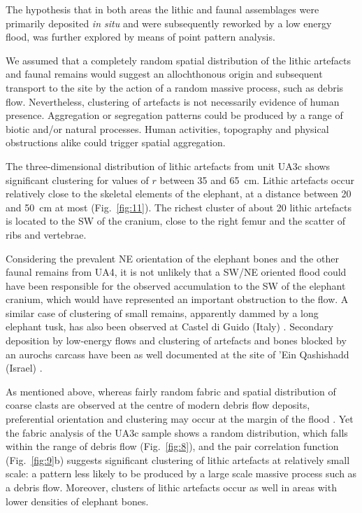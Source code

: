 \documentclass[preprint,authoryear,times]{elsarticle} %
\begin{document}
The hypothesis that in both areas the lithic and faunal assemblages were primarily deposited \emph{in situ} and were subsequently reworked by a low energy flood, was further explored by means of point pattern analysis.

We assumed that a completely random spatial distribution of the lithic artefacts and faunal remains would suggest an allochthonous origin and subsequent transport to the site by the action of a random massive process, such as debris flow. Nevertheless, clustering of artefacts is not necessarily evidence of human presence. Aggregation or segregation patterns could be produced by a range of biotic and/or natural processes. Human activities, topography and physical obstructions alike could trigger spatial aggregation.


The three-dimensional distribution of lithic artefacts from unit UA3c shows significant clustering for values of $r$ between 35 and 65~cm. Lithic artefacts occur relatively close to the skeletal elements of the elephant, at a distance between 20 and 50~cm at most (Fig.~\ref{fig:11}). The richest cluster of about 20 lithic artefacts is located to the SW of the cranium, close to the right femur and the scatter of ribs and vertebrae.

Considering the prevalent NE orientation of the elephant bones and the other faunal remains from UA4, it is not unlikely that a SW/NE oriented flood could have been responsible for the observed accumulation to the SW of the elephant cranium, which would have represented an important obstruction to the flow. A similar case of clustering of small remains, apparently dammed by a long elephant tusk, has also been observed at Castel di Guido (Italy) \citep{Boschian2010}. Secondary deposition by low-energy flows and clustering of artefacts and bones blocked by an aurochs carcass have been as well documented at the site of 'Ein Qashishadd (Israel) \citep{Hovers2014}.

As mentioned above, whereas fairly random fabric and spatial distribution of coarse clasts are observed at the centre of modern debris flow deposits, preferential orientation and clustering may occur at the margin of the flood \citep{Pierson2005}. Yet the fabric analysis of the UA3c sample shows a random distribution, which falls within the range of debris flow (Fig.~\ref{fig:8}), and the pair correlation function (Fig.~\ref{fig:9}b) suggests significant clustering of lithic artefacts at relatively small scale: a pattern less likely to be produced by a large scale massive process such as a debris flow. Moreover, clusters of lithic artefacts occur as well in areas with lower densities of elephant bones.
\end{document}
